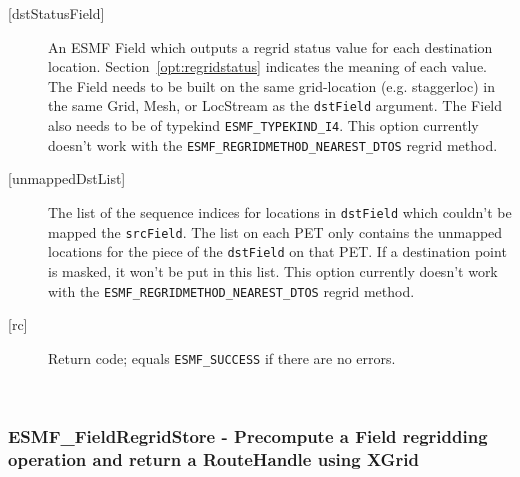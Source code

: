 \begin{description}
       \item [{[dstStatusField]}] 
             An ESMF Field which outputs a regrid status value for each destination location.
             Section~\ref{opt:regridstatus} indicates the meaning of each value. The Field needs to 
             be built on the same grid-location (e.g. staggerloc) in the same Grid, Mesh, or LocStream as the {\tt dstField} argument. 
             The Field also needs to be of typekind {\tt ESMF\_TYPEKIND\_I4}.  This option currently doesn't work with 
             the {\tt ESMF\_REGRIDMETHOD\_NEAREST\_DTOS} regrid method.
       \item [{[unmappedDstList]}] 
             The list of the sequence indices for locations in {\tt dstField} which couldn't be mapped the {\tt srcField}. 
             The list on each PET only contains the unmapped locations for the piece of the {\tt dstField} on that PET. 
             If a destination point is masked, it won't be put in this list. This option currently doesn't work with 
             the {\tt ESMF\_REGRIDMETHOD\_NEAREST\_DTOS} regrid method.
       \item [{[rc]}]
             Return code; equals {\tt ESMF\_SUCCESS} if there are no errors.
       \end{description}
   
 
\mbox{}\hrulefill\ 
 
\subsubsection [ESMF\_FieldRegridStore] {ESMF\_FieldRegridStore - Precompute a Field regridding operation and return a RouteHandle using XGrid}


